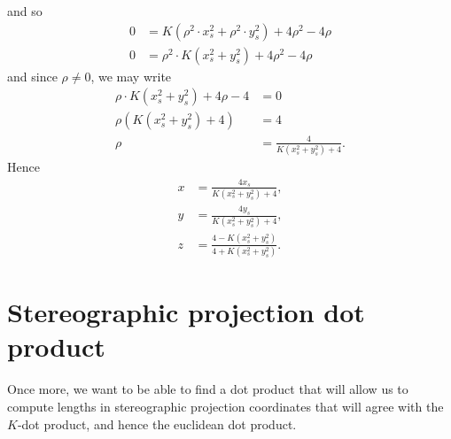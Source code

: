 \documentclass{ximera}
\begin{document}
\begin{problem}
\begin{freeResponse}
    and so
    \begin{align*}
      0 &= K\left(\rho^2\cdot x_s^2 + \rho^2\cdot y_s^2\right) + 4\rho^2-4\rho\\
      0 &= \rho^2\cdot K\left(x_s^2 + y_s^2\right) + 4\rho^2-4\rho
    \end{align*}
    and since $\rho \ne 0$, we may write
    \begin{align*}
      \rho\cdot K\left(x_s^2 + y_s^2\right) + 4\rho-4 &=0 \\
      \rho\left(K\left(x_s^2 + y_s^2\right) + 4\right) &=4\\
      \rho &= \frac{4}{K\left(x_s^2 + y_s^2\right) + 4}.
    \end{align*}
    Hence
    \begin{align*}
      x &= \frac{4x_s}{K\left(x_s^2 + y_s^2\right) + 4},\\
      y &= \frac{4y_s}{K\left(x_s^2 + y_s^2\right) + 4},\\
      z &= \frac{4-K\left(x_s^2 + y_s^2\right)}{4+K\left(x_s^2 + y_s^2\right)}.
    \end{align*}
  \end{freeResponse}
\end{problem}


\section{Stereographic projection dot product}

Once more, we want to be able to find a dot product that will allow us
to compute lengths in stereographic projection coordinates that will agree
with the $K$-dot product, and hence the euclidean dot product.
\end{document}
